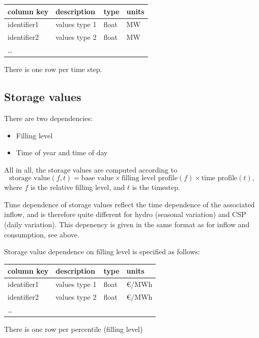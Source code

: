 \documentclass{article}
\begin{document}
\medskip
\begin{tabular}{llll}
	\hline
	column key & description 			& type & units \\
	\hline
	identifier1	& values type 1 		& float	& MW \\
	identifier2	& values type 2		& float	& MW \\
	\dots & & & \\
	\hline
\end{tabular}
\medskip

\noindent
There is one row per time step.




\subsection{Storage values}
There are two dependencies:

\begin{itemize}
\item Filling level
\item Time of year and time of day
\end{itemize}
All in all, the storage values are computed according to
\begin{equation}
	\label{eq:storagevalue_calc}
	 \text{storage value}(f,t) = \text{base value} \times \text{filling level profile}(f) \times \text{time profile}(t),
\end{equation}
where $f$ is the relative filling level, and $t$ is the timestep.


Time dependence of storage values reflect the time dependence of the associated inflow, and is therefore quite different for hydro (seasonal variation) and CSP (daily variation). This depenency is given in the same format as for inflow and consumption, see above.

Storage value dependence on filling level is specified as follows:

\medskip
\begin{tabular}{llll}
	\hline
	column key 		& description & type & units \\
	\hline
	identifier1		& values type 1 	& float	& \euro/MWh \\
	identifier2		& values type 2	& float	& \euro/MWh \\
	\dots & & & \\
	\hline
\end{tabular}
\medskip

\noindent
There is one row per percentile (filling level)
\end{document}
